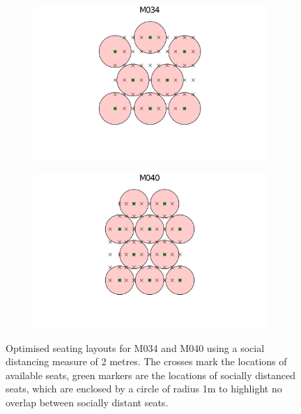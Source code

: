 \documentclass[12pt]{article}
\numberwithin{equation}{section}
\begin{document}
\begin{figure}[H]
         \centering
 \begin{subfigure}[b]{1\textwidth}
         \centering
         \includegraphics[width=0.97\textwidth]{M034_8_circles.png}
         \label{fig:E15}
     \end{subfigure}        
     \hfill
     \vspace{-2cm}
     \begin{subfigure}[b]{1\textwidth}
         \centering
         \includegraphics[width=0.97\textwidth]{M040_10_circles.png}
         \label{fig:M033}
     \end{subfigure}
         \hfill
         \caption{Optimised seating layouts for M034 and M040 using a social distancing measure of 2 metres. The crosses mark the locations of available seats, green markers are the locations of socially distanced seats, which are enclosed by a circle of radius 1m to highlight no overlap between socially distant seats.}
        \label{fig:M034 and M040}
\end{figure}
\end{document}
